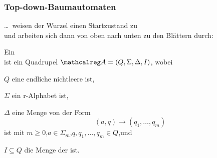     \begin{frame}
      \frametitle{Top-down-Baumautomaten}

      \dots\ weisen der Wurzel einen Startzustand zu \\
      und arbeiten sich dann von oben nach unten zu den Blättern durch:

      \par\medskip
        \begin{definition}
          Ein \\
          ist ein Quadrupel $\Aut{A} = (Q,\Sigma,\Delta,I)$, wobei
          \begin{Itemize}
            \item
              $Q$ eine endliche nichtleere  ist,
            \item
              $\Sigma$ ein r-Alphabet ist,
            \item
              $\Delta$ eine Menge von  der Form
              \[
                  (a,q) \to (q_1,\dots,q_m)
              \]
              ist mit $m \geqslant 0$,\quad $a \in \Sigma_m$,\quad $q,q_1,\dots,q_m \in Q$,\quad und
            \item
              $I \subseteq Q$ die Menge der  ist.
          \end{Itemize}%
          \label{def:NETDBA}%
          \vspace*{-2mm}
        \end{definition}


    \end{frame}

